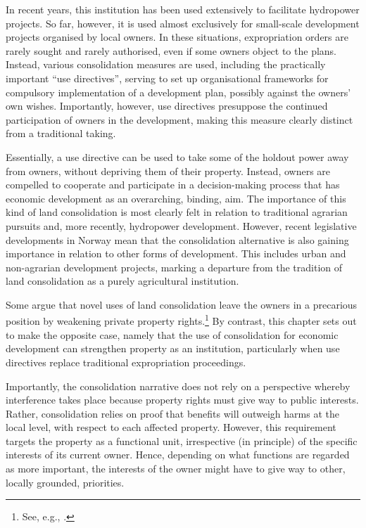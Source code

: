 In recent years, this institution has been used extensively to facilitate hydropower projects. So far, however, it is used almost exclusively for small-scale development projects organised by local owners. In these situations, expropriation orders are rarely sought and rarely authorised, even if some owners object to the plans. Instead, various consolidation measures are used, including the practically important ``use directives'', serving to set up organisational frameworks for compulsory implementation of a development plan, possibly against the owners' own wishes. Importantly, however, use directives presuppose the continued participation of owners in the development, making this measure clearly distinct from a traditional taking.

Essentially, a use directive can be used to take some of the holdout power away from owners, without depriving them of their property. Instead, owners are compelled to cooperate and participate in a decision-making process that has economic development as an overarching, binding, aim. The importance of this kind of land consolidation is most clearly felt in relation to traditional agrarian pursuits and,  more recently, hydropower development. However, recent legislative developments in Norway mean that the consolidation alternative is also gaining importance in relation to other forms of development. This includes urban and non-agrarian development projects, marking a departure from the tradition of land consolidation as a purely agricultural institution. 

Some argue that novel uses of land consolidation leave the owners in a precarious position by weakening private property rights.\footnote{See, e.g., \cite{stenseth07}.} By contrast, this chapter sets out to make the opposite case, namely that the use of consolidation for economic development can strengthen property as an institution, particularly when use directives replace traditional expropriation proceedings. 

Importantly, the consolidation narrative does not rely on a perspective whereby interference takes place because property rights must give way to public interests. Rather, consolidation relies on proof that benefits will outweigh harms at the local level, with respect to each affected property. However, this requirement targets the property as a functional unit, irrespective (in principle) of the specific interests of its current owner. Hence, depending on what functions are regarded as more important, the interests of the owner might have to give way to other, locally grounded, priorities.

